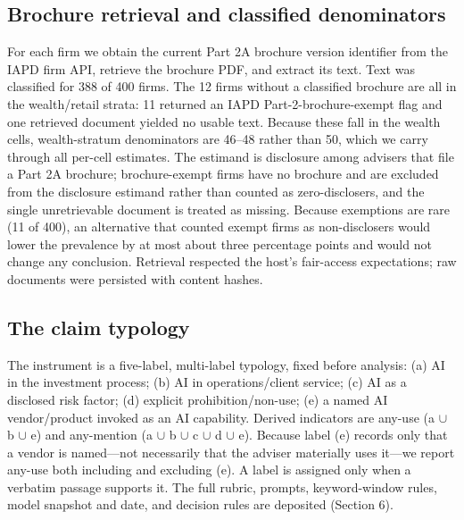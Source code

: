 \documentclass[utf8]{FrontiersinHarvard} %
\begin{document}
\subsection{Brochure retrieval and classified denominators}
For each firm we obtain the current Part 2A brochure version identifier from the IAPD firm API, retrieve the brochure PDF, and extract its text. Text was classified for 388 of 400 firms. The 12 firms without a classified brochure are all in the wealth/retail strata: 11 returned an IAPD Part-2-brochure-exempt flag and one retrieved document yielded no usable text. Because these fall in the wealth cells, wealth-stratum denominators are 46--48 rather than 50, which we carry through all per-cell estimates. The estimand is disclosure among advisers that file a Part 2A brochure; brochure-exempt firms have no brochure and are excluded from the disclosure estimand rather than counted as zero-disclosers, and the single unretrievable document is treated as missing. Because exemptions are rare (11 of 400), an alternative that counted exempt firms as non-disclosers would lower the prevalence by at most about three percentage points and would not change any conclusion. Retrieval respected the host's fair-access expectations; raw documents were persisted with content hashes.

\subsection{The claim typology}
The instrument is a five-label, multi-label typology, fixed before analysis: (a) AI in the investment process; (b) AI in operations/client service; (c) AI as a disclosed risk factor; (d) explicit prohibition/non-use; (e) a named AI vendor/product invoked as an AI capability. Derived indicators are any-use (a $\cup$ b $\cup$ e) and any-mention (a $\cup$ b $\cup$ c $\cup$ d $\cup$ e). Because label (e) records only that a vendor is named---not necessarily that the adviser materially uses it---we report any-use both including and excluding (e). A label is assigned only when a verbatim passage supports it. The full rubric, prompts, keyword-window rules, model snapshot and date, and decision rules are deposited (Section 6).
\end{document}
